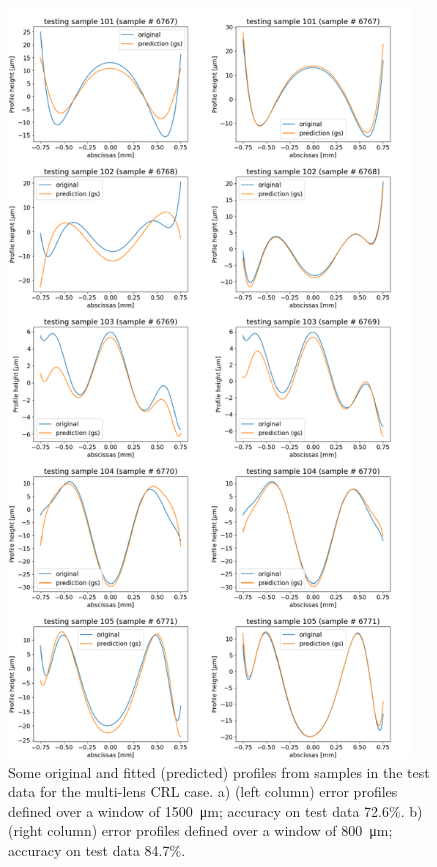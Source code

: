 \documentclass{iucr}
\begin{document}
\begin{figure}\label{fig:v26profiles}
\includegraphics[width=0.95\textwidth]{figures/figure7.pdf}




\caption{
Some original and fitted (predicted) profiles from samples in the test data for the multi-lens CRL case. a) (left column) error profiles defined over a window of \SI{1500}{\micro\meter};
accuracy on test data 72.6\%. 
b) (right column) error profiles defined over a window of \SI{800}{\micro\meter};
accuracy on test data 84.7\%.
    }
\end{figure}
\end{document}
